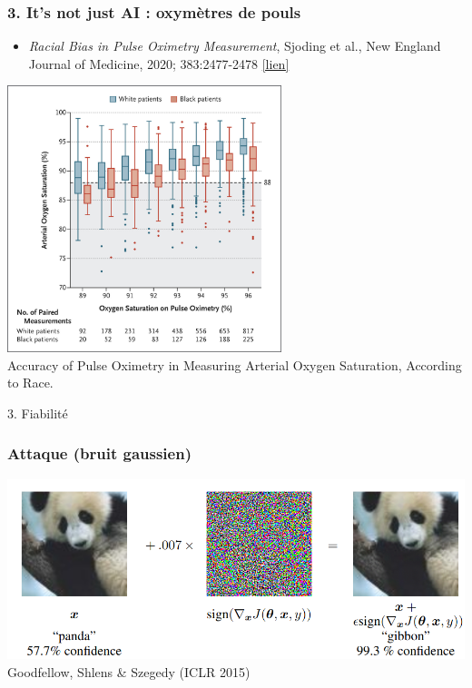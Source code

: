 \documentclass[sans,14pt]{beamer}
\begin{document}
{\begin{frame}
  \frametitle{3. It's not just AI : oxymètres de pouls}
  \begin{itemize}
  \item {\textit{Racial Bias in Pulse Oximetry Measurement}}, Sjoding et al., New
    England Journal of Medicine, 2020; 383:2477-2478 \href{https://www.nejm.org/doi/full/10.1056/NEJMc2029240}{[lien]}
  \end{itemize}
  \begin{center}
    \includegraphics[width=0.6\textwidth]{figures/nejmc_sjoding2020} \\
    \footnotesize Accuracy of Pulse Oximetry in Measuring Arterial Oxygen
    Saturation, According to Race.
  \end{center}
\end{frame}


\begin{frame}
  \begin{center}
    \Large 3. Fiabilité
  \end{center}
\end{frame}

\begin{frame}
  \frametitle{Attaque (bruit gaussien)}
  \begin{center}
    \includegraphics[width=\textwidth]{figures/adversarial_goodfellow_2015.png} \\
    {\footnotesize Goodfellow, Shlens \& Szegedy (ICLR 2015)}
  \end{center}
\end{frame}

}
\end{document}
